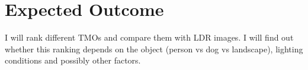 \documentclass[a4paper]{article}
\begin{document}

\section{Expected Outcome}
I will rank different TMOs and compare them with LDR images. I will find out whether this ranking depends on the object (person vs dog vs landscape), lighting conditions and possibly other factors.







\end{document}
